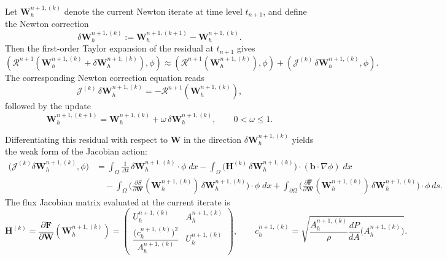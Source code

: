 \documentclass[11pt]{article}
\begin{document}
Let $\mathbf{W}_h^{n+1,(k)}$ denote the current Newton iterate at time level $t_{n+1}$,
and define the Newton correction
\[
  \delta\mathbf{W}_h^{n+1,(k)} :=
  \mathbf{W}_h^{n+1,(k+1)} - \mathbf{W}_h^{n+1,(k)}.
\]
Then the first-order Taylor expansion of the residual at $t_{n+1}$ gives
\begin{equation}\label{residual_vector}
 \boxed{
  \left(\mathcal{R}^{n+1}\!\left(\mathbf{W}_h^{n+1,(k)} + \delta\mathbf{W}_h^{n+1,(k)}\right), \phi\right)
  \approx
  \left( \mathcal{R}^{n+1}\!\left(\mathbf{W}_h^{n+1,(k)}\right), \phi \right)
  +\left( \mathcal{J}^{(k)}\,\delta\mathbf{W}_h^{n+1,(k)}, \phi \right) .}
\end{equation}
The corresponding Newton correction equation reads
\begin{equation}\label{main-equation}
  \mathcal{J}^{(k)}\,\delta\mathbf{W}_h^{n+1,(k)}
  = -\mathcal{R}^{n+1}\!\left(\mathbf{W}_h^{n+1,(k)}\right),
\end{equation}
followed by the update
\[
  \boxed{
  \mathbf{W}_h^{n+1,(k+1)}
  = \mathbf{W}_h^{n+1,(k)} + \omega\,\delta\mathbf{W}_h^{n+1,(k)},
  \qquad 0 < \omega \le 1.}
\]

 Differentiating this residual with respect to $\mathbf{W}$ in the direction
$\delta\mathbf{W}_h^{n+1,(k)}$ yields the weak form of the Jacobian action:
\begin{equation}\label{jacobian_weak}
\boxed{
\begin{aligned}
  \bigl(\mathcal{J}^{(k)}\delta\mathbf{W}_h^{n+1,(k)}, \phi\bigr)
  &=
  \int_{\Omega}
    \frac{1}{\Delta t}\,
    \delta\mathbf{W}_h^{n+1,(k)}\cdot\phi
  \;dx
  - \int_{\Omega}
    \Big(
      \mathbf{H}^{(k)}\,\delta\mathbf{W}_h^{n+1,(k)}
    \Big)
    \cdot(\bm b\!\cdot\!\nabla\phi)
  \;dx \\[2mm]
  &\quad
  - \int_{\Omega}
    \Big(
      \frac{\partial S}{\partial\mathbf{W}}
      (\mathbf{W}_h^{n+1,(k)})\,
      \delta\mathbf{W}_h^{n+1,(k)}
    \Big)\cdot\phi
  \;dx
  + \int_{\partial\Omega}
    \Big(
      \frac{\partial\widehat{\mathbf{F}}}{\partial\mathbf{W}}
      (\mathbf{W}_h^{n+1,(k)})\,
      \delta\mathbf{W}_h^{n+1,(k)}
    \Big)\cdot\phi\,ds.
\end{aligned}}
\end{equation}
The flux Jacobian matrix evaluated at the current iterate is
\[
  \mathbf{H}^{(k)}
  = \frac{\partial\mathbf{F}}{\partial\mathbf{W}}(\mathbf{W}_h^{n+1,(k)})
  =
  \begin{pmatrix}
    U_h^{n+1,(k)} & A_h^{n+1,(k)} \\[1mm]
    \dfrac{\big(c_h^{n+1,(k)}\big)^{2}}{A_h^{n+1,(k)}} & U_h^{n+1,(k)}
  \end{pmatrix},
  \qquad
  c_h^{n+1,(k)}
  = \sqrt{\frac{A_h^{n+1,(k)}}{\rho}\frac{dP}{dA}\!\big(A_h^{n+1,(k)}\big)}.
\]
\end{document}
